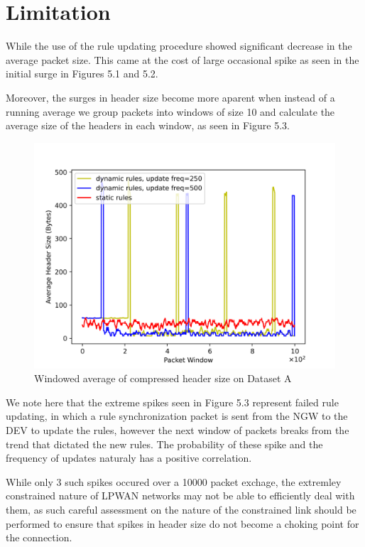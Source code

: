 \documentclass[12pt]{dalthesis}
\begin{document}
		
		\newpage
		\newpage
		\section{Limitation}
		While the use of the rule updating procedure showed significant decrease in the average packet size. This came at the cost 
		of large occasional spike as seen in the initial surge in Figures 5.1 and 5.2. 

		Moreover, the surges in header size become more aparent when instead of a running average we group packets into 
		windows of size 10 and calculate the average size of the headers in each window, as seen in Figure 5.3. 
	
	\begin{figure}[H]
			\centering
			\includegraphics[width=400pt]{images/windowed_average.png}
			\caption{Windowed average of compressed header size on Dataset A}
		\end{figure}

	

		We note here that the extreme spikes seen in Figure 5.3 represent failed rule updating, in which a rule synchronization packet is 
		sent from the NGW to the DEV to update the rules, however the next window of packets breaks from the trend that dictated the new rules.
		The probability of these spike and the frequency of updates naturaly has a positive correlation. 

		While only 3 such spikes occured over a 10000 packet exchage, the extremley constrained nature of LPWAN networks may not be able to
		efficiently deal with them, as such careful assessment on the nature of the constrained link should be performed to ensure that 
		spikes in header size do not become a choking point for the connection.
\end{document}
